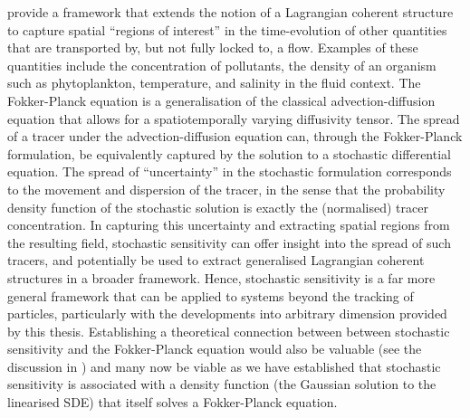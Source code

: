 \citet{BalasuriyaEtAl_2018_GeneralizedLagrangianCoherent} provide a framework that extends the notion of a Lagrangian coherent structure to capture spatial ``regions of interest'' in the time-evolution of other quantities that are transported by, but not fully locked to, a flow.
Examples of these quantities include the concentration of pollutants, the density of an organism such as phytoplankton, temperature, and salinity in the fluid context.
The Fokker-Planck equation is a generalisation of the classical advection-diffusion equation that allows for a spatiotemporally varying diffusivity tensor.
The spread of a tracer under the advection-diffusion equation can, through the Fokker-Planck formulation, be equivalently captured by the solution to a stochastic differential equation.
The spread of ``uncertainty'' in the stochastic formulation corresponds to the movement and dispersion of the tracer, in the sense that the probability density function of the stochastic solution is exactly the (normalised) tracer concentration.
In capturing this uncertainty and extracting spatial regions from the resulting field, stochastic sensitivity can offer insight into the spread of such tracers, and potentially be used to extract generalised Lagrangian coherent structures in a broader framework.
Hence, stochastic sensitivity is a far more general framework that can be applied to systems beyond the tracking of particles, particularly with the developments into arbitrary dimension provided by this thesis.
Establishing a theoretical connection between between stochastic sensitivity and the Fokker-Planck equation would also be valuable (see the discussion in \citet{Balasuriya_2020_StochasticApproachesLagrangian}) and many now be viable as we have established that stochastic sensitivity is associated with a density function (the Gaussian solution to the linearised SDE) that itself solves a Fokker-Planck equation.


